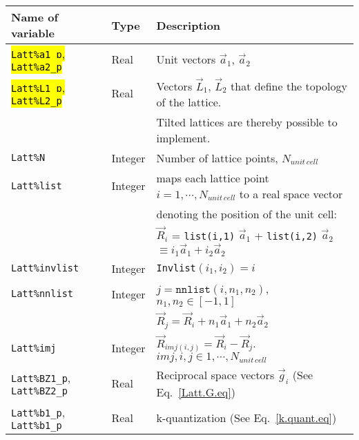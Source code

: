 \mycomment{

}
% 
%
\begin{table}[h]
   \begin{tabular}{l l l}
    Name of variable  & Type & Description \\\hline
     \hl{\texttt{Latt\%a1\_p}, \texttt{Latt\%a2\_p}}   & Real     & Unit vectors $\vec{a}_1$,  $\vec{a}_2$ \\ 
     \hl{\texttt{Latt\%L1\_p}, \texttt{Latt\%L2\_p}}   & Real     & Vectors $\vec{L}_1$, $\vec{L}_2$ that define the topology of the  lattice. \\
     									  &              &  Tilted lattices are  thereby possible to implement.  \\
    \texttt{Latt\%N}                                                 &   Integer &  Number of lattice points, $N_{unit\,cell}$   \\
    \texttt{Latt\%list}                                               & Integer &  maps each lattice point $i=1,\cdots, N_{unit\,cell}$ to a real space vector\\ 
                                                                             &   &  denoting the position of the unit cell: \\
                                                                             &   & $\vec{R}_i$ = \texttt{list(i,1)} $\vec{a}_1$ +  \texttt{list(i,2)} $\vec{a}_2$  $  \equiv i_1  \vec{a}_1 + i_2  \vec{a}_2 $ \\
    \texttt{Latt\%invlist}                                        &  Integer &   \texttt{Invlist}$(i_1,i_2) = i $ \\
    \texttt{Latt\%nnlist}                                         &  Integer &   $j = \texttt{nnlist} (i, n_1, n_2) $,  $n_1, n_2 \in [-1,1] $ \\
                                                                           &              &    $\vec{R}_j = \vec{R}_i + n_1 \vec{a}_1  + n_2 \vec{a}_2 $ \\
   \texttt{Latt\%imj}                                             &   Integer  &  $ \vec{R}_{imj(i,j)}  =  \vec{R}_i -  \vec{R}_j$.        $imj, i, j \in  1,\cdots, N_{unit\,cell}$\\
    \texttt{Latt\%BZ1\_p}, \texttt{Latt\%BZ2\_p}  &   Real     & Reciprocal space vectors $\vec{g}_i$   (See Eq.~\ref{Latt.G.eq})\\
    \texttt{Latt\%b1\_p}, \texttt{Latt\%b1\_p}       &   Real     &  k-quantization (See Eq.~\ref{k.quant.eq}) \\

\end{tabular}
\end{table}
